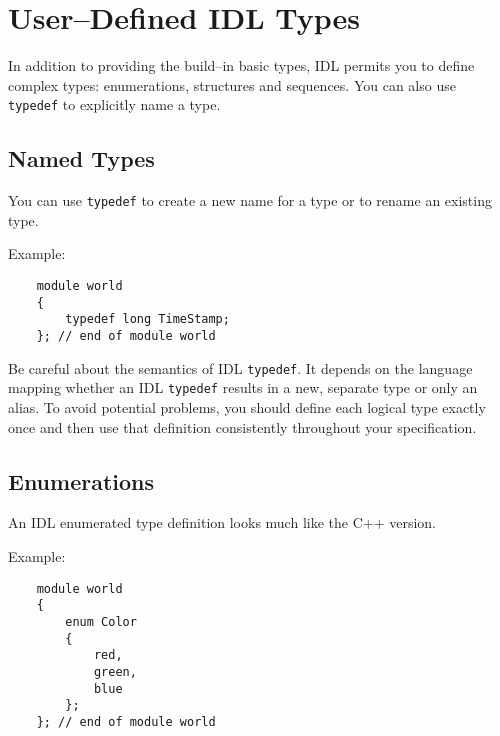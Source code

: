 \section{User--Defined IDL Types}
In addition to providing the build--in basic types, IDL permits you to define
complex types: enumerations, structures and sequences. You can also use {\tt 
typedef} to explicitly name a type.
\vspace{5mm}


\subsection{Named Types}

You can use {\tt typedef} to create a new name for a type or to rename an
existing type.

\vspace{2mm}
Example:
\begin{verbatim}
    module world
    {
        typedef long TimeStamp;
    }; // end of module world
\end{verbatim}

Be careful about the semantics of IDL {\tt typedef}. It depends on the language
mapping whether an IDL {\tt typedef} results in a new, separate type or only an
alias. 
To avoid potential problems, you should define each logical type exactly once
and then use that definition consistently throughout your specification.


\subsection{Enumerations}
An IDL enumerated type definition looks much like the C++ version.

\vspace{2mm}
Example:
\begin{verbatim}
    module world
    {
        enum Color 
        {
            red, 
            green, 
            blue
        };
    }; // end of module world
\end{verbatim}

